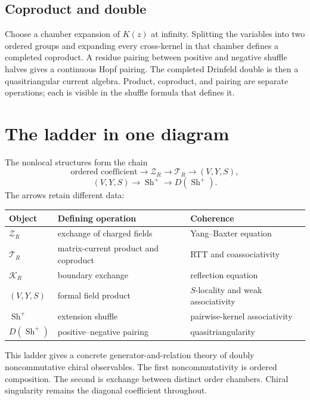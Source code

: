 \section{Coproduct and double}
Choose a chamber expansion of $K(z)$ at infinity.  Splitting the variables into two ordered groups and expanding every cross-kernel in that chamber defines a completed coproduct.  A residue pairing between positive and negative shuffle halves gives a continuous Hopf pairing.  The completed Drinfeld double is then a quasitriangular current algebra.  Product, coproduct, and pairing are separate operations; each is visible in the shuffle formula that defines it.

\chapter{The ladder in one diagram}
The nonlocal structures form the chain
\[
\text{ordered coefficient}
\longrightarrow \mathcal Z_R
\longrightarrow \mathcal T_R
\longrightarrow (V,Y,S),
\]
\[
(V,Y,S)
\longrightarrow \operatorname{Sh}^{+}
\longrightarrow D\!\left(\operatorname{Sh}^{+}\right).
\]
The arrows retain different data:
\begin{center}
\small
\begin{tabularx}{0.96\textwidth}{@{}>{\raggedright\arraybackslash}p{}>{\raggedright\arraybackslash}X>{\raggedright\arraybackslash}p{}@{}}
\toprule
\textbf{Object}&\textbf{Defining operation}&\textbf{Coherence}\\
\midrule
$\mathcal Z_R$&exchange of charged fields&Yang--Baxter equation\\
$\mathcal T_R$&matrix-current product and coproduct&RTT and coassociativity\\
$\mathcal K_R$&boundary exchange&reflection equation\\
$(V,Y,S)$&formal field product&$S$-locality and weak associativity\\
$\operatorname{Sh}^{+}$&extension shuffle&pairwise-kernel associativity\\
$D(\operatorname{Sh}^{+})$&positive--negative pairing&quasitriangularity\\
\bottomrule
\end{tabularx}
\end{center}
This ladder gives a concrete generator-and-relation theory of doubly noncommutative chiral observables.  The first noncommutativity is ordered composition.  The second is exchange between distinct order chambers.  Chiral singularity remains the diagonal coefficient throughout.


